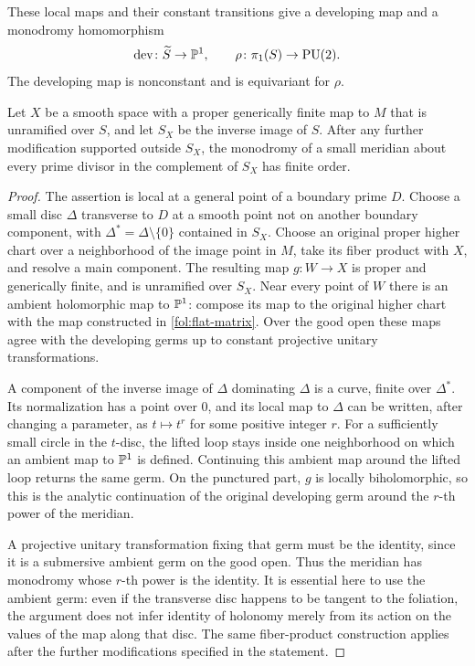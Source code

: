 These local maps and their constant transitions give a developing map
and a monodromy homomorphism
\begin{equation}\label{fol:developing-map}
 \operatorname{dev}\colon\widetilde S\to\mathbb{P}^1,\qquad
 \rho\colon\pi_1(S)\to\mathrm{PU}(2).
\end{equation}
The developing map is nonconstant and is equivariant for $\rho$.

\begin{lemma}\label{fol:finite-meridians}
Let $X$ be a smooth space with a proper generically finite map to $M$
that is unramified over $S$, and let $S_X$ be the inverse image of $S$.
After any further modification supported outside $S_X$, the monodromy
of a small meridian about every prime divisor in the complement of
$S_X$ has finite order.
\end{lemma}

\begin{proof}
The assertion is local at a general point of a boundary prime $D$.
Choose a small disc $\Delta$ transverse to $D$ at a smooth point not
on another boundary component, with $\Delta^*=\Delta\setminus\{0\}$
contained in $S_X$.  Choose an original proper higher chart over a
neighborhood of the image point in $M$, take its fiber product with
$X$, and resolve a main component.  The resulting map
$g\colon W\to X$ is proper and generically finite, and is unramified
over $S_X$.  Near every point of $W$ there is an ambient holomorphic
map to $\mathbb{P}^1$: compose its map to the original higher chart with the
map constructed in \eqref{fol:flat-matrix}.  Over the good open these
maps agree with the developing germs up to constant projective
unitary transformations.

A component of the inverse image of $\Delta$ dominating $\Delta$
is a curve, finite over $\Delta^*$.  Its normalization has a point over
$0$, and its local map to $\Delta$ can be written, after changing a
parameter, as $t\mapsto t^r$ for some positive integer $r$.
For a sufficiently small circle in the $t$-disc, the lifted loop stays
inside one neighborhood on which an ambient map to $\mathbb{P}^1$ is
defined.  Continuing this ambient map around the lifted loop returns
the same germ.  On the punctured part, $g$ is locally biholomorphic,
so this is the analytic continuation of the original developing germ
around the $r$-th power of the meridian.

A projective unitary transformation fixing that germ must be the
identity, since it is a submersive ambient germ on the good open.
Thus the meridian has monodromy whose $r$-th power is the identity.
It is essential here to use the ambient germ: even if the transverse
disc happens to be tangent to the foliation, the argument does not
infer identity of holonomy merely from its action on the values of
the map along that disc.  The same fiber-product construction applies
after the further modifications specified in the statement.
\end{proof}

